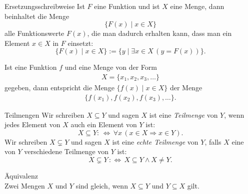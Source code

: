 \begin{concept}{Ersetzungsschreibweise}
Ist $F$ eine Funktion und ist $X$ eine Menge, dann beinhaltet die Menge
\[
\big\{F(x)\mid x\in X \big\}
\]
alle Funktionswerte $F(x)$, die man dadurch erhalten kann, dass man ein Element $x\in X$ in $F$ einsetzt:
\[
\big\{F(x)\mid x\in X\big\}:=\{y\mid \exists x\in X\,(y=F(x))\}.
\]
\end{concept}

\begin{remark}
    Ist eine Funktion $f$ und eine Menge von der Form
    \begin{align*}
        X=\{x_1,x_2,x_3,\dots\}
    \end{align*}
    gegeben, dann entspricht die Menge $\{f(x)\mid x\in X\}$ der Menge
    \begin{align*}
        \{f(x_1),f(x_2),f(x_3),\dots\}.
    \end{align*}
\end{remark}

\begin{comment}
\begin{remark}
    Das Prinzip der Ersetzungsschreibweise findet sich als Funktion zum Manipulieren von Datensätzen in vielen Programmiersprachen wieder:
    \begin{itemize}
        \item Haskell: \texttt{map, fmap}
        \item Java: \texttt{map()}
        \item Python: \texttt{map}
        \item C\#: \texttt{.select}
    \end{itemize}
\end{remark}
\end{comment}


\begin{definition}{Teilmengen}
 Wir schreiben $X\subseteq Y$ und sagen $X$ ist eine \textit{Teilmenge} von $Y$, wenn jedes Element von $X$ auch ein Element von $Y$ ist:
\[
X\subseteq Y:\,\Leftrightarrow\,\forall x\,(x\in X\Rightarrow x\in Y).
\]
Wir schreiben $X\subsetneq Y$ und sagen $X$ ist eine \textit{echte Teilmenge} von $Y$, falls $X$ eine von $Y$ verschiedene Teilmenge von $Y$ ist:
\[
X\subsetneq Y\,:\Leftrightarrow\, X\subseteq Y\land X\neq Y.
\]
\end{definition}

\begin{lemma}{Äquivalenz}\\
Zwei Mengen $X$ und $Y$ sind gleich, wenn $X\subseteq Y$ und $Y\subseteq X$ gilt.
\end{lemma}

